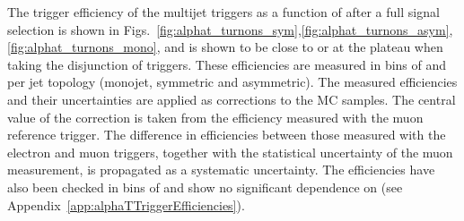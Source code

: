 


The trigger efficiency of the multijet triggers as a function of \mht after a full signal selection 
is shown in Figs.~\ref{fig:alphat_turnons_sym},\ref{fig:alphat_turnons_asym},\ref{fig:alphat_turnons_mono}, and is shown to be close to or at the plateau when taking 
the disjunction of triggers. These efficiencies are measured in bins of \scalht and \mht
per jet topology (monojet, symmetric and asymmetric). The measured
efficiencies and their uncertainties are applied as corrections to the MC
samples. The central value of the correction is taken from the efficiency
measured with the muon reference trigger. The difference in efficiencies between
those measured with the electron and muon triggers, together with the
statistical uncertainty of the muon measurement, is propagated as a systematic
uncertainty. The efficiencies have also been checked in bins of \njet and show
no significant dependence on \njet (see Appendix~\ref{app:alphaTTriggerEfficiencies}).

